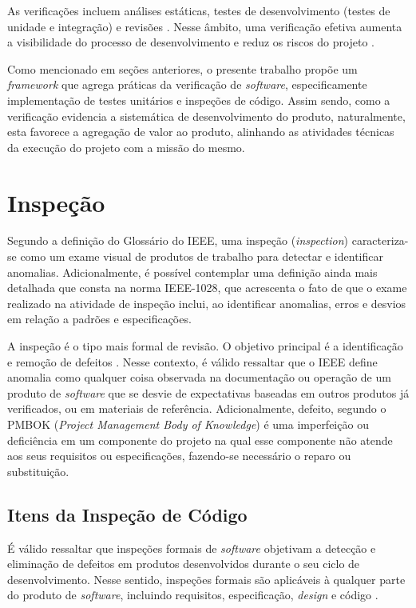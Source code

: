 As verificações incluem análises estáticas, testes de desenvolvimento (testes de unidade e integração) e revisões \cite{paulafilho}. Nesse âmbito, uma verificação efetiva aumenta a visibilidade do processo de desenvolvimento e reduz os riscos do projeto \cite{verificacao1}.

Como mencionado em seções anteriores, o presente trabalho propõe um \textit{framework} que agrega práticas da verificação de \textit{software}, especificamente implementação de testes unitários e inspeções de código. Assim sendo, como a verificação evidencia a sistemática de desenvolvimento do produto, naturalmente, esta favorece a agregação de valor ao produto, alinhando as atividades técnicas da execução do projeto com a missão do mesmo.

\section{Inspeção}

Segundo a definição do Glossário do IEEE, uma inspeção (\textit{inspection}) caracteriza-se como um exame visual de produtos de trabalho para detectar e identificar anomalias. Adicionalmente, é possível contemplar uma definição ainda mais detalhada que consta na norma IEEE-1028, que acrescenta o fato de que o exame realizado na atividade de inspeção inclui, ao identificar anomalias, erros e desvios em relação a padrões e especificações.

A inspeção é o tipo mais formal de revisão. O objetivo principal é a identificação e remoção de defeitos \cite{paulafilho}. Nesse contexto, é válido ressaltar que o IEEE define anomalia como qualquer coisa observada na documentação ou operação de um produto de \textit{software} que se desvie de expectativas baseadas em outros produtos já verificados, ou em materiais de referência. Adicionalmente, defeito, segundo o PMBOK (\textit{Project Management Body of Knowledge}) é uma imperfeição ou deficiência em um componente do projeto na qual esse componente não atende aos seus requisitos ou especificações, fazendo-se necessário o reparo ou substituição.

\subsection{Itens da Inspeção de Código}

É válido ressaltar que inspeções formais de \textit{software} objetivam a detecção e eliminação de defeitos em produtos desenvolvidos durante o seu ciclo de desenvolvimento. Nesse sentido, inspeções formais são aplicáveis à qualquer parte do produto de \textit{software}, incluindo requisitos, especificação, \textit{design} e código \cite{inspecao1}.

